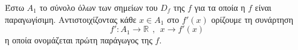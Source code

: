 Έστω $ A_1 $ το σύνολο όλων των σημείων του $ D_f $ της $ f $ για τα οποία η $ f $ είναι παραγωγίσιμη. Αντιστοιχίζοντας κάθε $ x\in A_1 $ στο $ f'(x) $ ορίζουμε τη συνάρτηση
\[ f':A_1\to \mathbb{R} \ \ ,\ \ x\to f'(x) \]
η οποία ονομάζεται πρώτη παράγωγος της $ f $.
